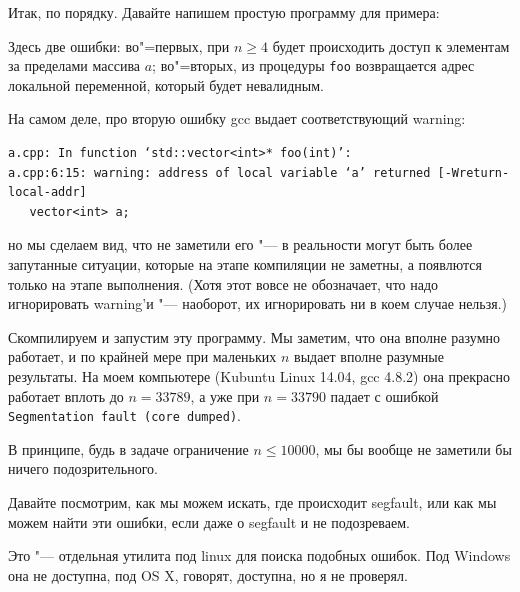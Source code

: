 \documentclass[a4paper,10pt]{problems}
\begin{document}
Итак, по порядку. Давайте напишем простую программу для примера:


Здесь две ошибки: во"=первых, при $n\geq 4$ будет происходить доступ к элементам за пределами массива $a$; во"=вторых, 
из процедуры \verb`foo` возвращается адрес локальной переменной, который будет невалидным.

На самом деле, про вторую ошибку gcc выдает соответствующий warning:
\begin{verbatim}
a.cpp: In function ‘std::vector<int>* foo(int)’:
a.cpp:6:15: warning: address of local variable ‘a’ returned [-Wreturn-local-addr]
   vector<int> a;
\end{verbatim}
но мы сделаем вид, что не заметили его "--- в реальности могут быть более запутанные ситуации, которые на этапе компиляции не заметны, а появлются
только на этапе выполнения. 
(Хотя этот вовсе не обозначает, что надо игнорировать warning'и "--- наоборот, их игнорировать ни в коем случае нельзя.)

Скомпилируем и запустим эту программу. 
Мы заметим, что она вполне разумно работает, и по крайней мере при маленьких $n$ выдает вполне разумные результаты.
На моем компьютере (Kubuntu Linux 14.04, gcc 4.8.2) она прекрасно работает вплоть до $n=33789$, 
а уже при $n=33790$ падает с ошибкой \verb`Segmentation fault (core dumped)`.

В принципе, будь в задаче ограничение $n\leq 10000$, мы бы вообще не заметили бы ничего подозрительного.

Давайте посмотрим, как мы можем искать, где происходит segfault, или как мы можем найти эти ошибки, если даже о segfault и не подозреваем.

 Это "--- отдельная утилита под linux для поиска подобных ошибок. Под Windows она не доступна, под OS X, говорят, доступна, но я не проверял.
\end{document}
